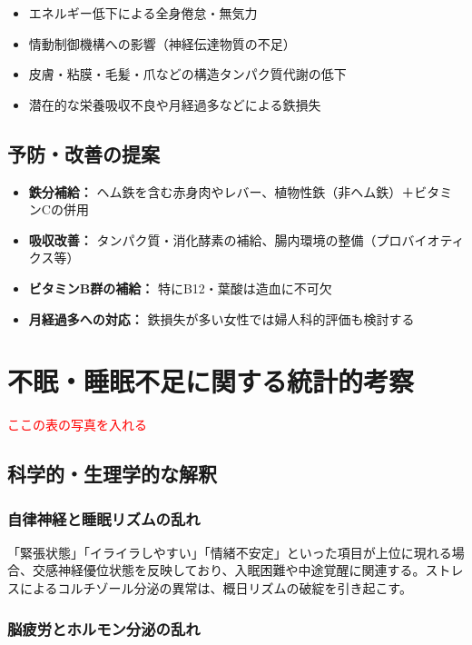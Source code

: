 \documentclass[a4paper,12pt]{article}
\begin{document}
\begin{itemize}
  \item エネルギー低下による全身倦怠・無気力
  \item 情動制御機構への影響（神経伝達物質の不足）
  \item 皮膚・粘膜・毛髪・爪などの構造タンパク質代謝の低下
  \item 潜在的な栄養吸収不良や月経過多などによる鉄損失
\end{itemize}

\subsection*{予防・改善の提案}

\begin{itemize}
  \item \textbf{鉄分補給：} ヘム鉄を含む赤身肉やレバー、植物性鉄（非ヘム鉄）＋ビタミンCの併用
  \item \textbf{吸収改善：} タンパク質・消化酵素の補給、腸内環境の整備（プロバイオティクス等）
  \item \textbf{ビタミンB群の補給：} 特にB12・葉酸は造血に不可欠
  \item \textbf{月経過多への対応：} 鉄損失が多い女性では婦人科的評価も検討する
\end{itemize}


\section{不眠・睡眠不足に関する統計的考察}

\textcolor{red}{ここの表の写真を入れる}

\subsection*{科学的・生理学的な解釈}

\subsubsection*{自律神経と睡眠リズムの乱れ}

「緊張状態」「イライラしやすい」「情緒不安定」といった項目が上位に現れる場合、交感神経優位状態を反映しており、入眠困難や中途覚醒に関連する。ストレスによるコルチゾール分泌の異常は、概日リズムの破綻を引き起こす。

\subsubsection*{脳疲労とホルモン分泌の乱れ}
\end{document}
